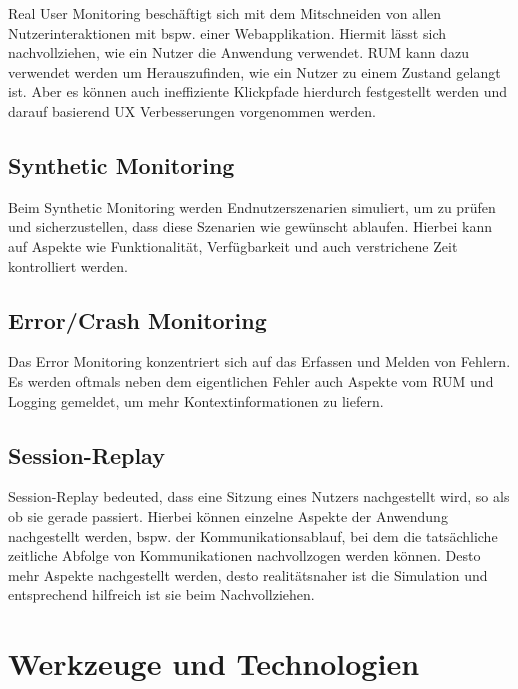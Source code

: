 Real User Monitoring beschäftigt sich mit dem Mitschneiden von allen Nutzerinteraktionen mit bspw. einer Webapplikation. Hiermit lässt sich nachvollziehen, wie ein Nutzer die Anwendung verwendet. RUM kann dazu verwendet werden um Herauszufinden, wie ein Nutzer zu einem Zustand gelangt ist. Aber es können auch ineffiziente Klickpfade hierdurch festgestellt werden und darauf basierend UX Verbesserungen vorgenommen werden.

\subsection{Synthetic Monitoring}

Beim Synthetic Monitoring werden Endnutzerszenarien simuliert, um zu prüfen und sicherzustellen, dass diese Szenarien wie gewünscht ablaufen. Hierbei kann auf Aspekte wie Funktionalität, Verfügbarkeit und auch verstrichene Zeit kontrolliert werden.

\subsection{Error/Crash Monitoring}

Das Error Monitoring konzentriert sich auf das Erfassen und Melden von Fehlern. Es werden oftmals neben dem eigentlichen Fehler auch Aspekte vom RUM und Logging gemeldet, um mehr Kontextinformationen zu liefern.

\subsection{Session-Replay}

Session-Replay bedeuted, dass eine Sitzung eines Nutzers nachgestellt wird, so als ob sie gerade passiert. Hierbei können einzelne Aspekte der Anwendung nachgestellt werden, bspw. der Kommunikationsablauf, bei dem die tatsächliche zeitliche Abfolge von Kommunikationen nachvollzogen werden können. Desto mehr Aspekte nachgestellt werden, desto realitätsnaher ist die Simulation und entsprechend hilfreich ist sie beim Nachvollziehen.

\newpage

\section{Werkzeuge und Technologien}
\label{sec:werkzeuge-und-technologien}

%
%

